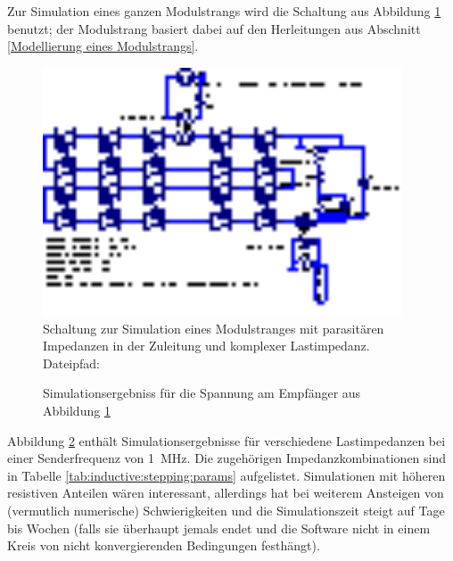 Zur  Simulation eines  ganzen Modulstrangs  wird die  Schaltung aus  Abbildung
\ref{fig:ltspice:inductive:complete}  benutzt; der  Modulstrang basiert  dabei
auf den Herleitungen aus Abschnitt \ref{Modellierung eines Modulstrangs}.

\begin{figure}[h!tb]
    \centering
    \includegraphics[width=0.95\textwidth]{images/ltspice/jac/inductive.eps}
    \caption[Induktive Einkopplung, -Schaltung f\"ur Modulstrang]{%
        Schaltung  zur   Simulation  eines  Modulstranges   mit  parasit\"aren
        Impedanzen in der Zuleitung und komplexer Lastimpedanz.\protect\\
        Dateipfad: %
    }
    \label{fig:ltspice:inductive:complete}
\end{figure}

\begin{figure}[h!tb]
    
    \caption[Simulationsergebniss, induktive Einkopplung, Modulstrang]{%
        Simulationsergebniss f\"ur die Spannung am Empf\"anger aus Abbildung
        \ref{fig:ltspice:inductive:complete}%
    }
    \label{fig:simu:inductive:stepping}
\end{figure}

Abbildung  \ref{fig:simu:inductive:stepping}  enth\"alt  Simulationsergebnisse
f\"ur    verschiedene   Lastimpedanzen    bei    einer   Senderfrequenz    von
\SI{1}{\mega\hertz}.   Die zugeh\"origen Impedanzkombinationen sind in Tabelle
\ref{tab:inductive:stepping:params}  aufgelistet. Simulationen  mit  h\"oheren
resistiven  Anteilen w\"aren  interessant, allerdings  hat   bei
weiterem  Ansteigen von   (vermutlich  numerische) Schwierigkeiten
und  die Simulationszeit  steigt auf  Tage bis  Wochen (falls  sie \"uberhaupt
jemals endet und  die Software nicht in einem Kreis  von nicht konvergierenden
Bedingungen festh\"angt).

